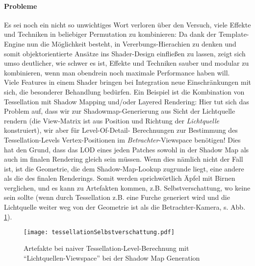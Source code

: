 	\paragraph{Probleme}
	Es sei noch ein nicht so unwichtiges Wort verloren über den Versuch, viele Effekte und Techniken in beliebiger
	Permutation zu kombinieren: Da dank der Template-Engine nun die Möglichkeit besteht, in Vererbungs-Hierachien zu denken
	und somit objektorientierte Ansätze ins Shader-Design einfließen zu lassen, zeigt sich umso deutlicher,
	wie schwer es ist, Effekte und Techniken sauber und modular zu kombinieren, wenn man obendrein noch maximale
	Performance haben will.\\
	Viele Features in einem Shader bringen bei Integration neue Einschränkungen mit sich, 
	die besonderer Behandlung bedürfen.
	Ein Beispiel ist die Kombination von Tessellation mit Shadow Mapping und/oder Layered Rendering: 
	Hier tut sich das Problem auf, dass wir zur Shadowmap-Generierung aus Sicht der Lichtquelle rendern 
	(die View-Matrix ist aus Position und Richtung der \emph{Lichtquelle} konstruiert), wir aber für Level-Of-Detail-	
	Berechnungen zur Bestimmung des Tessellation-Levels	Vertex-Positionen im \emph{Betrachter}-Viewspace benötigen!
	Dies hat den Grund, dass das LOD eines jeden Patches sowohl in der Shadow Map als auch im finalen Rendering
	gleich sein müssen. Wenn dies nämlich nicht der Fall ist, ist die Geometrie, die dem Shadow-Map-Lookup
	zugrunde liegt, eine andere als die des finalen Renderings. Somit werden sprichwörtlich Äpfel mit Birnen verglichen,
	und es kann zu Artefakten kommen, z.B. Selbstverschattung, wo keine sein sollte (wenn durch Tessellation z.B.
	eine Furche generiert wird und die Lichtquelle weiter weg von der Geometrie ist als die Betrachter-Kamera, 
	s. Abb. \ref{fig:tessellationSelbstverschattung}).
	
	\begin{figure}[!h]
		\texttt{[image: tessellationSelbstverschattung.pdf]}
		\caption{Artefakte bei naiver Tessellation-Level-Berechnung mit 
		"`Lichtquellen-Viewspace"' bei der Shadow Map Generation}
		\label{fig:tessellationSelbstverschattung}
	\end{figure}
	
